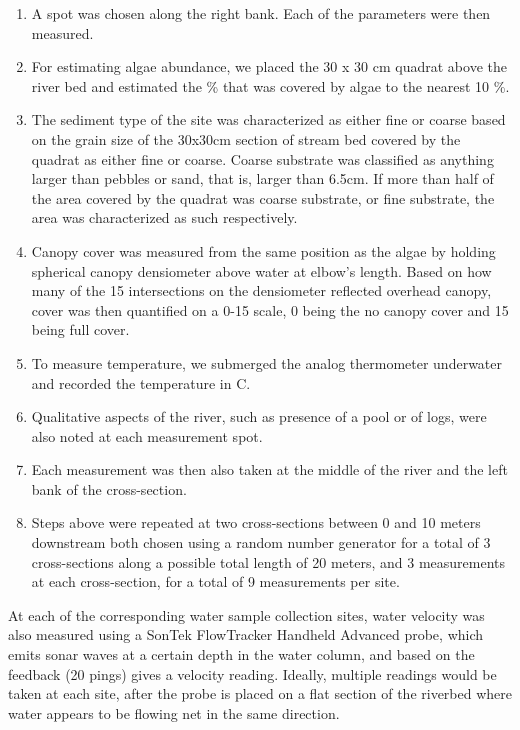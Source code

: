 \documentclass{article}\usepackage[]{graphicx}\usepackage[]{color}
\begin{document}
\begin{enumerate}
\item A spot was chosen along the right bank. Each of the parameters were then measured.
\item For estimating algae abundance, we placed the 30  x 30 cm quadrat above the river bed and estimated the \% that was covered by algae to the nearest 10 \%.

\item The sediment type of the site was characterized as either fine or coarse based on the grain size of the 30x30cm section of stream bed covered by the quadrat as either fine or coarse. Coarse substrate was classified as anything larger than pebbles or sand, that is, larger than 6.5cm. If more than half of the area covered by the quadrat was coarse substrate, or fine substrate, the area was characterized as such respectively.

\item Canopy cover was measured from the same position as the algae by holding spherical canopy densiometer above water at elbow's length. Based on how many of the 15 intersections on the densiometer reflected overhead canopy, cover was then quantified on a 0-15 scale, 0 being the no canopy cover and 15 being full cover.

\item To measure temperature, we submerged the analog thermometer underwater and recorded the temperature in \textdegree C.

\item Qualitative aspects of the river, such as presence of a pool or of logs, were also noted at each measurement spot.

\item Each measurement was then also taken at the middle of the river and the left bank of the cross-section. 

\item Steps above were repeated at two cross-sections between 0 and 10 meters downstream both chosen using a random number generator for a total of 3 cross-sections along a possible total length of 20 meters, and 3 measurements at each cross-section, for a total of 9 measurements per site. 
\end{enumerate}

At each of the corresponding water sample collection sites, water velocity was also measured using a SonTek FlowTracker Handheld Advanced probe, which emits sonar waves at a certain depth in the water column, and based on the feedback (20 pings) gives a velocity reading. Ideally, multiple readings would be taken at each site, after the probe is placed on a flat section of the riverbed where water appears to be flowing net in the same direction. 
\end{document}
